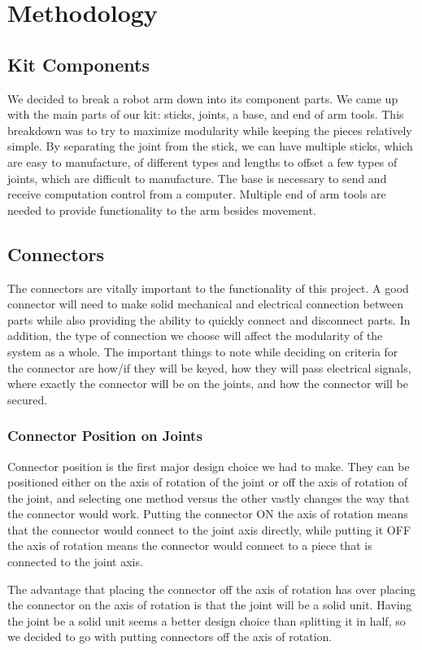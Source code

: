 \section{Methodology}
\subsection{Kit Components}
We decided to break a robot arm down into its component parts. We came up with the main parts of our kit: sticks, joints, a base, and end of arm tools. This breakdown was to try to maximize modularity while keeping the pieces relatively simple. By separating the joint from the stick, we can have multiple sticks, which are easy to manufacture, of different types and lengths to offset a few types of joints, which are difficult to manufacture. The base is necessary to send and receive computation control from a computer. Multiple end of arm tools are needed to provide functionality to the arm besides movement.

\subsection{Connectors}
The connectors are vitally important to the functionality of this project. A good connector will need to make solid mechanical and electrical connection between parts while also providing the ability to quickly connect and disconnect parts. In addition, the type of connection we choose will affect the modularity of the system as a whole. The important things to note while deciding on criteria for the connector are how/if they will be keyed, how they will pass electrical signals, where exactly the connector will be on the joints, and how the connector will be secured.

\subsubsection{Connector Position on Joints}
Connector position is the first major design choice we had to make. They can be positioned either on the axis of rotation of the joint or off the axis of rotation of the joint, and selecting one method versus the other vastly changes the way that the connector would work. Putting the connector ON the axis of rotation means that the connector would connect to the joint axis directly, while putting it OFF the axis of rotation means the connector would connect to a piece that is connected to the joint axis.

\noindent The advantage that placing the connector off the axis of rotation has over placing the connector on the axis of rotation is that the joint will be a solid unit. Having the joint be a solid unit seems a better design choice than splitting it in half, so we decided to go with putting connectors off the axis of rotation.

